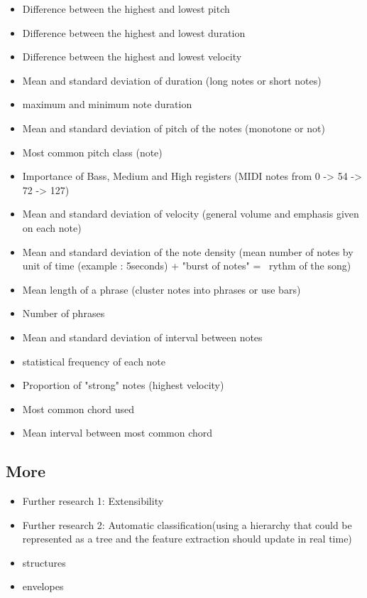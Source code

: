 \documentclass[a4paper,12pt]{article}
\begin{document}
    \begin{itemize}
        \item Difference between the highest and lowest pitch
        \item Difference between the highest and lowest duration
        \item Difference between the highest and lowest velocity
        \item Mean and standard deviation of duration (long notes or short notes)
        \item maximum and minimum note duration
        \item Mean and standard deviation of pitch of the notes (monotone or not)
        \item Most common pitch class (note)
        \item Importance of Bass, Medium and High registers (MIDI notes from 0 -> 54 -> 72 -> 127)
        \item Mean and standard deviation of velocity (general volume and emphasis given on each note)
        \item Mean and standard deviation of the note density (mean number of notes by unit of time (example : 5seconds) + "burst of notes" =~ rythm of the song) 
        \item Mean length of a phrase (cluster notes into phrases or use bars)
        \item Number of phrases
        \item Mean and standard deviation of interval between notes
        \item statistical frequency of each note 
        \item Proportion of "strong" notes (highest velocity)
        \item Most common chord used
        \item Mean interval between most common chord
    \end{itemize}

\subsection{More}

\begin{itemize}
    \item Further research 1: Extensibility
    \item Further research 2: Automatic classification(using a hierarchy that could be represented as a tree and the feature extraction should update in real time)
    \item structures
    \item envelopes
\end{itemize}


\end{document}
